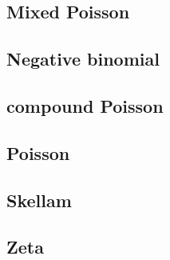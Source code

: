 \subsection{Mixed Poisson}
\subsection{Negative binomial}
\subsection{compound Poisson}
\subsection{Poisson}
\subsection{Skellam}
\subsection{Zeta}
